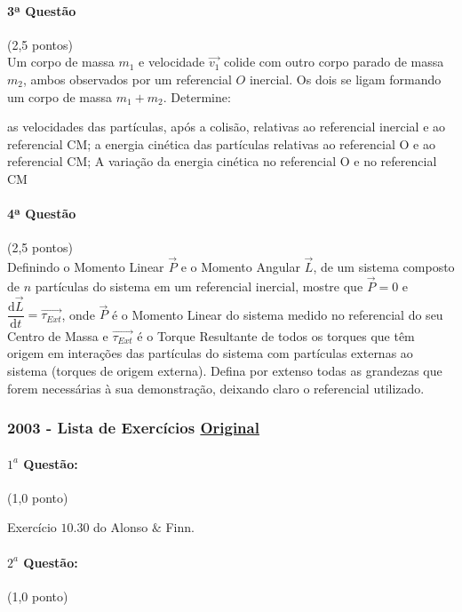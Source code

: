 \documentclass[12pt,a4paper]{article}
\newcommand{\dd}{\mathrm{d}}
\newcommand{\original}[1]{\tiny \href{#1}{Original} \normalsize}
\begin{document}
\paragraph{3ª Questão} (2,5 pontos)\\
Um corpo de massa $m_1$ e velocidade $\overrightarrow{v_1}$ colide com outro corpo parado de massa $m_2$, ambos observados por um referencial $O$ inercial. Os dois se ligam formando um corpo de massa $m_1 + m_2$. Determine:
\begin{tasks}
\task as velocidades das partículas, após a colisão, relativas ao referencial inercial e ao referencial CM;
\task a energia cinética das partículas relativas ao referencial O e ao referencial CM;
\task A variação da energia cinética no referencial O e no referencial CM
\end{tasks}

\paragraph{4ª Questão} (2,5 pontos)\\
Definindo o Momento Linear $\overrightarrow{P}$ e o Momento Angular $\overrightarrow{L}$, de um sistema composto de $n$ partículas do sistema em um referencial inercial, mostre que $\overrightarrow{P} = 0$ e $\dfrac{\dd \overrightarrow{L}}{\dd t} = \overrightarrow{\tau _{Ext}}$, onde $\overrightarrow{P}$ é o Momento Linear do sistema medido no referencial do seu Centro de Massa e $\overrightarrow{\tau _{Ext}}$ é o Torque Resultante de todos os torques que têm origem em interações das partículas do sistema com partículas externas ao sistema (torques de origem externa). Defina por extenso todas as grandezas que forem necessárias à sua demonstração, deixando claro o referencial utilizado.
\newpage
\subsubsection{2003 - Lista de Exercícios \original{https://drive.google.com/open?id=1OqYX1h_cbI4DNim9YMLSBSbIpLETelhT}}

\paragraph{$1^a$ Questão:} (1,0 ponto)

Exercício $10.30$ do Alonso $\&$ Finn.

\paragraph{$2^a$ Questão:} (1,0 ponto)
\end{document}
